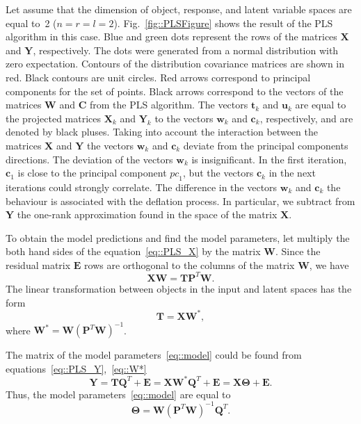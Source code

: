 \documentclass[12pt,twoside]{article}
\begin{document}
Let assume that the dimension of object, response, and latent variable spaces are equal to~2 ($n = r = l = 2$).
Fig.~\ref{fig::PLSFigure} shows the result of the PLS algorithm in this case.
Blue and green dots represent the rows of the matrices $\mathbf{X}$ and $\mathbf{Y}$, respectively. 
The dots were generated from a normal distribution with zero expectation. 
Contours of the distribution covariance matrices are shown in red.
Black contours are unit circles. 
Red arrows correspond to principal components for the set of points. 
Black arrows correspond to the vectors of the matrices $\mathbf{W}$ and $\mathbf{C}$ from the PLS algorithm. 
The vectors $\mathbf{t}_k$ and $\mathbf{u}_k$ are equal to the projected matrices $\mathbf{X}_k$ and $\mathbf{Y}_k$ to the vectors $\mathbf{w}_k$ and $\mathbf{c}_k$, respectively, and are denoted by black pluses. 
Taking into account the interaction between the matrices $\mathbf{X}$ and $\mathbf{Y}$ the vectors $\mathbf{w}_k$ and $\mathbf{c}_k$ deviate from the principal components directions. 
The deviation of the vectors $\mathbf{w}_k$ is insignificant. 
In the first iteration, $\mathbf{c}_1$ is close to the principal component $\textit{pc}_1$, but the vectors $\mathbf{c}_k$ in the next iterations could strongly correlate. 
The difference in the vectors $\mathbf{w}_k$ and $\mathbf{c}_k$ the behaviour is associated with the deflation process. In particular, we subtract from $\mathbf{Y}$ the one-rank approximation found in the space of the matrix $\mathbf{X}$.

To obtain the model predictions and find the model parameters, let multiply the both hand sides of the equation~\eqref{eq::PLS_X} by the matrix $\mathbf{W}$. 
Since the residual matrix  $\mathbf{E}$ rows are orthogonal to the columns of the matrix $\mathbf{W}$, we have
\[
	\mathbf{X} \mathbf{W} = \mathbf{T} \mathbf{P}^{T} \mathbf{W}.
\]
The linear transformation between objects in the input and latent spaces has the form
\begin{equation}
	\mathbf{T} = \mathbf{X} \mathbf{W}^*,
	\label{eq::W*}
\end{equation}
where $\mathbf{W}^* = \mathbf{W} (\mathbf{P}^{T} \mathbf{W})^{-1}$.

The matrix of the model parameters~\ref{eq::model} could be found from equations~\eqref{eq::PLS_Y},~\eqref{eq::W*}
\begin{equation*}
    \mathbf{Y} = \mathbf{T} \mathbf{Q}^{T} + \mathbf{E} = \mathbf{X} \mathbf{W}^* \mathbf{Q}^{T} + \mathbf{E} = \mathbf{X} \boldsymbol{\Theta} + \mathbf{E}.
\end{equation*}
Thus, the model parameters~\eqref{eq::model} are equal to
\begin{equation}
    \boldsymbol{\Theta} = \mathbf{W} (\mathbf{P}^{T} \mathbf{W})^{-1} \mathbf{Q}^{T}.
    \label{eq::model_parameters}
\end{equation}
\end{document}
